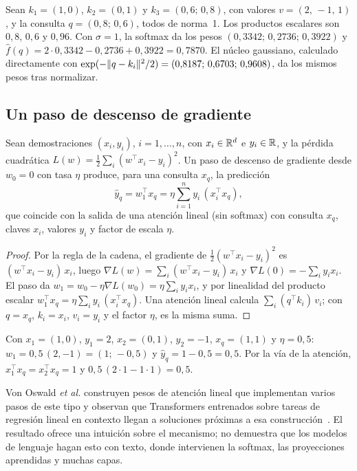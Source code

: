 \begin{ejemplo}\label{ej:nw}
Sean $k_1=(1,0)$, $k_2=(0,1)$ y $k_3=(0{,}6;\,0{,}8)$, con valores $v=(2,\,-1,\,1)$, y la consulta $q=(0{,}8;\,0{,}6)$, todos de norma~1. Los productos escalares son $0{,}8$, $0{,}6$ y $0{,}96$. Con $\sigma=1$, la softmax da los pesos $(0{,}3342;\,0{,}2736;\,0{,}3922)$ y $\hat f(q)=2\cdot 0{,}3342-0{,}2736+0{,}3922=0{,}7870$. El núcleo gaussiano, calculado directamente con $\exp(-\lVert q-k_i\rVert^{2}/2)=(0{,}8187;\,0{,}6703;\,0{,}9608)$, da los mismos pesos tras normalizar.
\end{ejemplo}

\subsection{Un paso de descenso de gradiente}

\begin{teorema}\label{teo:icl-gd}
Sean demostraciones $(x_i,y_i)$, $i=1,\dots,n$, con $x_i\in\mathbb{R}^{d}$ e $y_i\in\mathbb{R}$, y la pérdida cuadrática $L(w)=\tfrac12\sum_i(w^{\top}x_i-y_i)^{2}$. Un paso de descenso de gradiente desde $w_0=0$ con tasa $\eta$ produce, para una consulta $x_q$, la predicción
\[
\hat y_q=w_1^{\top}x_q=\eta\sum_{i=1}^{n}y_i\,(x_i^{\top}x_q),
\]
que coincide con la salida de una atención lineal (sin softmax) con consulta $x_q$, claves $x_i$, valores $y_i$ y factor de escala $\eta$.
\end{teorema}

\begin{proof}
Por la regla de la cadena, el gradiente de $\tfrac12(w^{\top}x_i-y_i)^{2}$ es $(w^{\top}x_i-y_i)\,x_i$, luego $\nabla L(w)=\sum_i(w^{\top}x_i-y_i)\,x_i$ y $\nabla L(0)=-\sum_i y_i x_i$. El paso da $w_1=w_0-\eta\nabla L(w_0)=\eta\sum_i y_ix_i$, y por linealidad del producto escalar $w_1^{\top}x_q=\eta\sum_i y_i\,(x_i^{\top}x_q)$. Una atención lineal calcula $\sum_i(q^{\top}k_i)\,v_i$; con $q=x_q$, $k_i=x_i$, $v_i=y_i$ y el factor $\eta$, es la misma suma.
\end{proof}

\begin{ejemplo}\label{ej:icl-gd}
Con $x_1=(1,0)$, $y_1=2$, $x_2=(0,1)$, $y_2=-1$, $x_q=(1,1)$ y $\eta=0{,}5$: $w_1=0{,}5\,(2,-1)=(1;\,-0{,}5)$ y $\hat y_q=1-0{,}5=0{,}5$. Por la vía de la atención, $x_1^{\top}x_q=x_2^{\top}x_q=1$ y $0{,}5\,(2\cdot 1-1\cdot 1)=0{,}5$.
\end{ejemplo}

\begin{observacion}
Von Oswald \emph{et al.} construyen pesos de atención lineal que implementan varios pasos de este tipo y observan que Transformers entrenados sobre tareas de regresión lineal en contexto llegan a soluciones próximas a esa construcción~\cite{vonoswald}. El resultado ofrece una intuición sobre el mecanismo; no demuestra que los modelos de lenguaje hagan esto con texto, donde intervienen la softmax, las proyecciones aprendidas y muchas capas.
\end{observacion}

